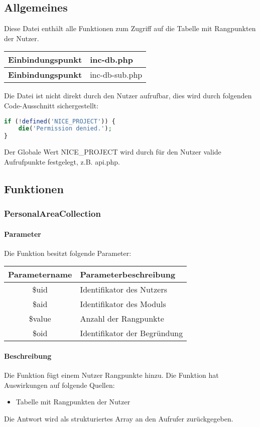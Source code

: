 \subsection{Allgemeines} Diese Datei enthält alle Funktionen zum Zugriff auf die Tabelle mit Rangpunkten der Nutzer.
\begin{table}[H]
	\begin{tabular}{|c|p{11cm}|}
		\hline
		\textbf{Einbindungspunkt} & inc-db.php \\ \hline
		\textbf{Einbindungspunkt} & inc-db-sub.php \\ \hline
	\end{tabular}
\end{table}
Die Datei ist nicht direkt durch den Nutzer aufrufbar, dies wird durch folgenden Code-Ausschnitt sichergestellt:
\begin{lstlisting}[language=php]
if (!defined('NICE_PROJECT')) {
	die('Permission denied.');
}
\end{lstlisting}
Der Globale Wert {\glqq NICE\_PROJECT\grqq} wird durch für den Nutzer valide Aufrufpunkte festgelegt, z.B. {\glqq api.php\grqq}.
\newpage
\subsection{Funktionen}
\subsubsection{PersonalAreaCollection}
\paragraph{Parameter} Die Funktion besitzt folgende Parameter:
\begin{table}[H]
	\begin{tabular}{|c|p{11cm}|}
		\hline
		\textbf{Parametername} & \textbf{Parameterbeschreibung} \\ \hline
		\$uid   & Identifikator des Nutzers \\ \hline
		\$aid   & Identifikator des Moduls \\ \hline
		\$value & Anzahl der Rangpunkte \\ \hline
		\$oid   & Identifikator der Begründung \\ \hline
	\end{tabular}
\end{table}
\paragraph{Beschreibung} Die Funktion fügt einem Nutzer Rangpunkte hinzu. Die Funktion hat Auswirkungen auf folgende Quellen:
\begin{itemize}
	\item Tabelle mit Rangpunkten der Nutzer
\end{itemize}
Die Antwort wird als strukturiertes Array an den Aufrufer zurückgegeben.
